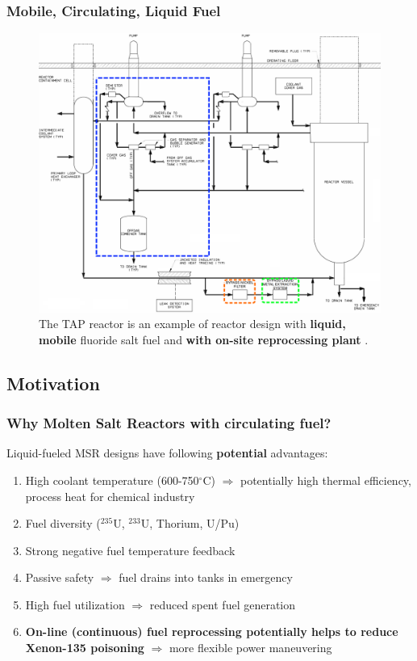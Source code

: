 \begin{frame} %
\frametitle{Mobile, Circulating, Liquid Fuel}
\vspace{-2mm}
\begin{figure}[t]
      \includegraphics[height=0.63\textwidth]{./images/tap_primary_loop.png}
    \vspace{-2mm}
	\caption{The \gls{TAP} reactor is an example of reactor design with 
	\textbf{liquid, mobile} fluoride salt fuel and \textbf{with on-site 
	reprocessing plant}	\cite{transatomic_power_corporation_technical_2016}.}
\end{figure}   

\end{frame}


\subsection{Motivation}

\begin{frame}
\frametitle{Why Molten Salt Reactors with circulating fuel?}
\begin{block}{Liquid-fueled MSR designs have following \textbf{potential} 
advantages:}
	\begin{enumerate}
		\itemsep1em
		\item High coolant temperature (600-750$^{\circ}$C) 
		$\Rightarrow$ potentially high thermal efficiency, process 
		heat for chemical industry
		\item Fuel diversity ($^{235}$U, $^{233}$U, Thorium, U/Pu)
		\item Strong negative fuel temperature feedback 
		\item Passive safety $\Rightarrow$ fuel drains into tanks 
		in emergency
		\item High fuel utilization $\Rightarrow$ reduced spent fuel 
		generation
		\item<2> \textbf{On-line (continuous) fuel reprocessing potentially  
		helps to reduce Xenon-135 poisoning} $\Rightarrow$ more flexible  
		power maneuvering
	\end{enumerate}
\end{block}

\end{frame}


